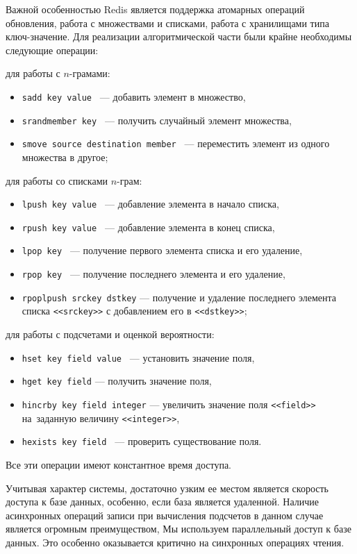 Важной особенностью Redis является поддержка атомарных операций обновления,
работа с множествами и списками, работа с хранилищами типа ключ-значение.
Для реализации алгоритмической части были крайне необходимы следующие операции:
\begin{ditemize}
	\item  для работы с $n$-грамами:
	\begin{itemize}
		\item {\tt sadd key value } --- добавить элемент в множество,
		\item {\tt srandmember key  } --- получить случайный элемент множества,
		\item {\tt smove source destination member } --- переместить элемент из одного множества в другое;
	\end{itemize}
	\item для работы со списками $n$-грам:	
	\begin{itemize}
		\item {\tt lpush key value } --- добавление элемента в начало списка,
		\item {\tt rpush key value } --- добавление элемента в конец списка,
		\item {\tt lpop key } --- получение первого элемента списка и его удаление,
		\item {\tt rpop key } --- получение последнего элемента и его удаление,
		\item {\tt rpoplpush srckey dstkey} --- получение и удаление последнего 
			элемента списка {\tt <<srckey>>} с добавлением его в {\tt <<dstkey>>};
	\end{itemize}
	\pagebreak
	\item  для работы с подсчетами и оценкой вероятности:
	\begin{itemize}
		\item {\tt hset key field value } --- установить значение поля,
		\item {\tt hget key field} --- получить значение поля,
		\item {\tt hincrby key field integer} --- увеличить значение поля {\tt <<field>>}
			на~заданную величину {\tt <<integer>>},
		\item {\tt hexists key field } --- проверить существование поля.
	\end{itemize}
\end{ditemize}
Все эти операции имеют константное время доступа.

Учитывая характер системы, достаточно узким ее местом
является скорость доступа к базе данных, особенно, если база является удаленной.
Наличие асинхронных операций записи при вычисления подсчетов в данном 
случае является огромным преимуществом, 
Мы используем параллельный доступ к базе данных. 
Это особенно оказывается критично на синхронных 
операциях чтения.

